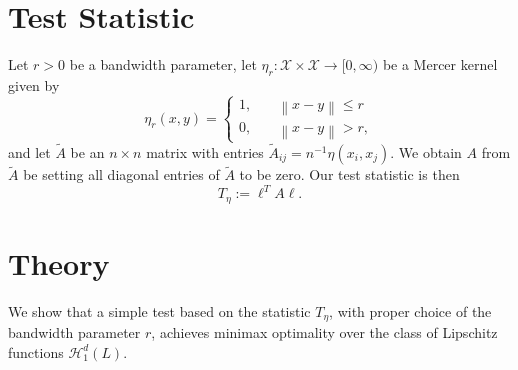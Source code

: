 \documentclass{article}
\newcommand{\norm}[1]{\left\lVert#1\right\rVert}
\newcommand{\1}{\mathbb{I}}
\theoremstyle{alden}
\theoremstyle{aldenthm}
\theoremstyle{definition}
\theoremstyle{remark}
\begin{document}
\section{Test Statistic}

Let $r > 0$ be a bandwidth parameter, let $\eta_r: \mathcal{X} \times \mathcal{X} \to [0,\infty)$ be a Mercer kernel given by
\begin{equation*}
\eta_r(x,y) =
\begin{cases}
1, \quad & \textrm{$\norm{x - y} \leq r$} \\
0, \quad & \textrm{$\norm{x - y} > r$},
\end{cases}
\end{equation*}
and let $\widetilde{A}$ be an $n \times n$ matrix with entries $\widetilde{A}_{ij} = n^{-1}\eta(x_i,x_j)$. We obtain $A$ from $\widetilde{A}$ be setting all diagonal entries of $\widetilde{A}$ to be zero. Our test statistic is then
\begin{equation*}
T_{\eta} := \ell^T A \ell.
\end{equation*}

\section{Theory}

We show that a simple test based on the statistic $T_{\eta}$, with proper choice of the bandwidth parameter $r$, achieves minimax optimality over the class of Lipschitz functions $\mathcal{H}_{1}^{d}(L)$.
\end{document}
